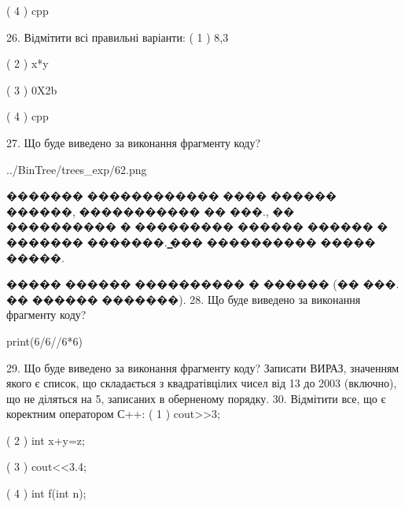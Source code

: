 \documentclass[11pt]{article}
\begin{document}
( 4 ) cpp

26. Відмітити всі правильні варіанти:
( 1 ) 8,3

( 2 ) x*y

( 3 ) 0X2b

( 4 ) cpp

27. Що буде виведено за виконання фрагменту коду?

\begin{center}
	{../BinTree/trees_exp/62.png}
\end{center}
������� ������������ ���� ������ ������, ����������� �� ���., �� ���������� � ��������� ������ ������ � ������� �������. ̳��� ���������� ����� �����.\par ����� ������ ���������� � ������ (�� ���. �� ������ �������).
28. Що буде виведено за виконання фрагменту коду?

print(6/6//6*6)

29. Що буде виведено за виконання фрагменту коду?
Записати ВИРАЗ, значенням якого є список, що складається з квадратівцілих чисел від 13 до 2003 (включно), що не діляться на 5, записаних в оберненому порядку.
30. Відмітити все, що є коректним оператором С++:
( 1 ) cout>>3;

( 2 ) int x+y=z;

( 3 ) cout<<3.4;

( 4 ) int f(int n);































\newpage
\end{document}
